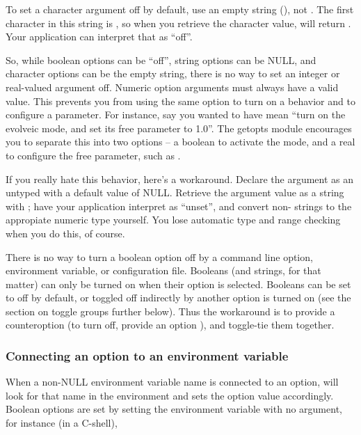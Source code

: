 To set a character argument off by default, use an empty string
(), not . The first character in this string is
, so when you retrieve the character value,
 will return . Your
application can interpret that as ``off''.

So, while boolean options can be ``off'', string options can be NULL,
and character options can be the empty string, there is no way to set
an integer or real-valued argument off. Numeric option arguments must
always have a valid value. This prevents you from using the same
option to turn on a behavior and to configure a parameter. For
instance, say you wanted to have  mean
``turn on the evolveic mode, and set its free parameter to 1.0''. The
getopts module encourages you to separate this into two options -- a
boolean to activate the mode, and a real to configure the free
parameter, such as .

If you really hate this behavior, here's a workaround.  Declare the
argument as an untyped  with a default value of
NULL. Retrieve the argument value as a string with
; have your application interpret
 as ``unset'', and convert non- strings to the
appropiate numeric type yourself.  You lose automatic type and range
checking when you do this, of course.
   
There is no way to turn a boolean option off by a command line option,
environment variable, or configuration file. Booleans (and strings,
for that matter) can only be turned on when their option is
selected. Booleans can be set to off by default, or toggled off
indirectly by another option is turned on (see the section on toggle
groups further below). Thus the workaround is to provide a
counteroption (to turn  off, provide an option
), and toggle-tie them together.



   \subsubsection{Connecting an option to an environment variable}

When a non-NULL environment variable name is connected to an option,
 will look for that name in the
environment and sets the option value accordingly. Boolean options are
set by setting the environment variable with no argument, for instance
(in a C-shell),

